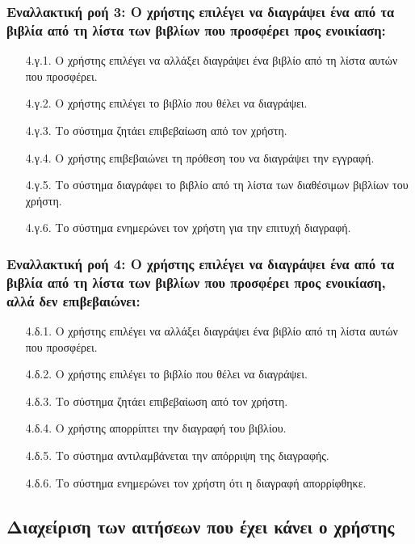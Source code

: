 \documentclass[12pt,a4paper]{article}
\begin{document}
\subsubsection*{Εναλλακτική ροή 3: Ο χρήστης επιλέγει να διαγράψει ένα από τα βιβλία από τη λίστα των βιβλίων που προσφέρει προς ενοικίαση:}
\begin{enumerate}
    \item [4.γ.1.] Ο χρήστης επιλέγει να αλλάξει διαγράψει ένα βιβλίο από τη λίστα αυτών που προσφέρει.
    \item [4.γ.2.] Ο χρήστης επιλέγει το βιβλίο που θέλει να διαγράψει.
    \item [4.γ.3.] Το σύστημα ζητάει επιβεβαίωση από τον χρήστη.
    \item [4.γ.4.] Ο χρήστης επιβεβαιώνει τη πρόθεση του να διαγράψει την εγγραφή.
    \item [4.γ.5.] Το σύστημα διαγράφει το βιβλίο από τη λίστα των διαθέσιμων βιβλίων του χρήστη.
    \item [4.γ.6.] Το σύστημα ενημερώνει τον χρήστη για την επιτυχή διαγραφή.
\end{enumerate}

\subsubsection*{Εναλλακτική ροή 4: Ο χρήστης επιλέγει να διαγράψει ένα από τα βιβλία από τη λίστα των βιβλίων που προσφέρει προς ενοικίαση, αλλά δεν επιβεβαιώνει:}
\begin{enumerate}
    \item [4.δ.1.] Ο χρήστης επιλέγει να αλλάξει διαγράψει ένα βιβλίο από τη λίστα αυτών που προσφέρει.
    \item [4.δ.2.] Ο χρήστης επιλέγει το βιβλίο που θέλει να διαγράψει.
    \item [4.δ.3.] Το σύστημα ζητάει επιβεβαίωση από τον χρήστη.
    \item [4.δ.4.] Ο χρήστης απορρίπτει την διαγραφή του βιβλίου.
    \item [4.δ.5.] Το σύστημα αντιλαμβάνεται την απόρριψη της διαγραφής.
    \item [4.δ.6.] Το σύστημα ενημερώνει τον χρήστη ότι η διαγραφή απορρίφθηκε.
\end{enumerate}

\subsection{Διαχείριση των αιτήσεων που έχει κάνει ο χρήστης}
\end{document}
